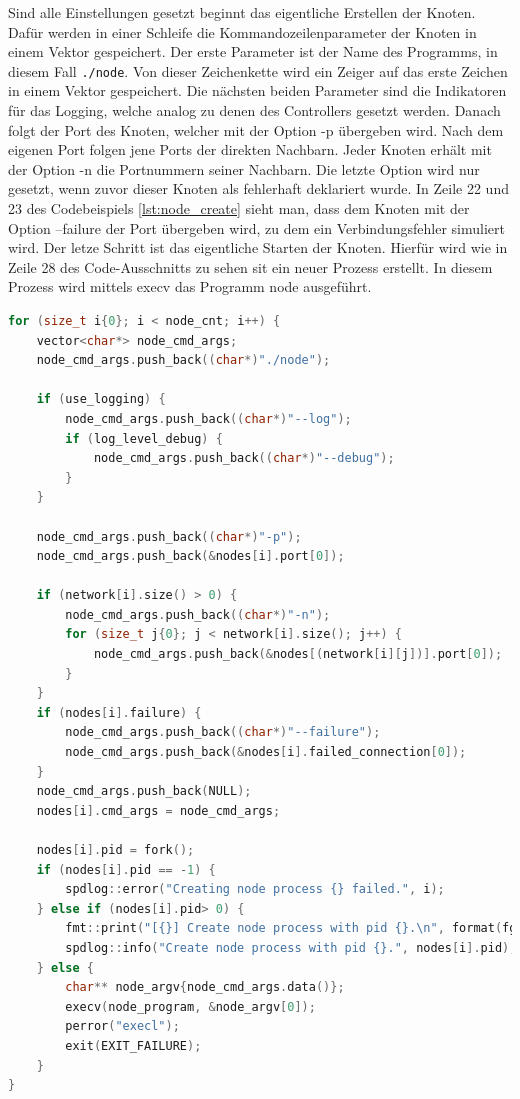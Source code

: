 Sind alle Einstellungen gesetzt beginnt das eigentliche Erstellen der Knoten. Dafür werden in einer Schleife die Kommandozeilenparameter der Knoten in einem Vektor gespeichert. Der erste Parameter ist der Name des Programms, in diesem Fall \verb|./node|. Von dieser Zeichenkette wird ein Zeiger auf das erste Zeichen in einem Vektor gespeichert. Die nächsten beiden Parameter sind die Indikatoren für das Logging, welche analog zu denen des Controllers gesetzt werden. Danach folgt der Port des Knoten, welcher mit der Option -p übergeben wird. Nach dem eigenen Port folgen jene Ports der direkten Nachbarn. Jeder Knoten erhält mit der Option -n die Portnummern seiner Nachbarn. Die letzte Option wird nur gesetzt, wenn zuvor dieser Knoten als fehlerhaft deklariert wurde. In Zeile 22 und 23 des Codebeispiels \ref{lst:node_create} sieht man, dass dem Knoten mit der Option --failure der Port übergeben wird, zu dem ein Verbindungsfehler simuliert wird. Der letze Schritt ist das eigentliche Starten der Knoten. Hierfür wird wie in Zeile 28 des Code-Ausschnitts zu sehen sit ein neuer Prozess erstellt. In diesem Prozess wird mittels execv  das Programm node ausgeführt.

\begin{lstlisting}[language={C++}, caption={Erstellen der Knoten}, label={lst:node_create}]
for (size_t i{0}; i < node_cnt; i++) {
    vector<char*> node_cmd_args;
    node_cmd_args.push_back((char*)"./node");
    
    if (use_logging) {
        node_cmd_args.push_back((char*)"--log");
        if (log_level_debug) {
            node_cmd_args.push_back((char*)"--debug");
        }
    }
    
    node_cmd_args.push_back((char*)"-p");
    node_cmd_args.push_back(&nodes[i].port[0]);
    
    if (network[i].size() > 0) {
        node_cmd_args.push_back((char*)"-n");
        for (size_t j{0}; j < network[i].size(); j++) {
            node_cmd_args.push_back(&nodes[(network[i][j])].port[0]);
        }
    }
    if (nodes[i].failure) {
        node_cmd_args.push_back((char*)"--failure");
        node_cmd_args.push_back(&nodes[i].failed_connection[0]);
    }
    node_cmd_args.push_back(NULL);
    nodes[i].cmd_args = node_cmd_args;

    nodes[i].pid = fork();
    if (nodes[i].pid == -1) {
        spdlog::error("Creating node process {} failed.", i);
    } else if (nodes[i].pid> 0) {
        fmt::print("[{}] Create node process with pid {}.\n", format(fg(fmt::color::magenta), "Controller"), nodes[i].pid);
        spdlog::info("Create node process with pid {}.", nodes[i].pid);
    } else {
        char** node_argv{node_cmd_args.data()};
        execv(node_program, &node_argv[0]);
        perror("execl");
        exit(EXIT_FAILURE);
    }
}
\end{lstlisting}

